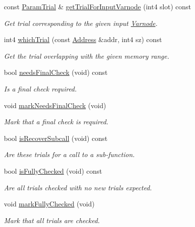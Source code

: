 \begin{DoxyCompactItemize}
const \mbox{\hyperlink{class_param_trial}{Param\+Trial}} \& \mbox{\hyperlink{class_param_active_a4ce9f8640c32eb48df409ff71a6e15eb}{get\+Trial\+For\+Input\+Varnode}} (int4 slot) const
\begin{DoxyCompactList}\small\item\em Get trial corresponding to the given input \mbox{\hyperlink{class_varnode}{Varnode}}. \end{DoxyCompactList}\item 
int4 \mbox{\hyperlink{class_param_active_a94904915a57b3a27a68053e85d6d08e1}{which\+Trial}} (const \mbox{\hyperlink{class_address}{Address}} \&addr, int4 sz) const
\begin{DoxyCompactList}\small\item\em Get the trial overlapping with the given memory range. \end{DoxyCompactList}\item 
bool \mbox{\hyperlink{class_param_active_a3b308bb5dafd2bafc5e425991deab476}{needs\+Final\+Check}} (void) const
\begin{DoxyCompactList}\small\item\em Is a final check required. \end{DoxyCompactList}\item 
void \mbox{\hyperlink{class_param_active_a7cf85723002b79c4500f3eba9159b7fa}{mark\+Needs\+Final\+Check}} (void)
\begin{DoxyCompactList}\small\item\em Mark that a final check is required. \end{DoxyCompactList}\item 
bool \mbox{\hyperlink{class_param_active_a3335a98aec79bc7b683f6edc0e954c96}{is\+Recover\+Subcall}} (void) const
\begin{DoxyCompactList}\small\item\em Are these trials for a call to a sub-\/function. \end{DoxyCompactList}\item 
bool \mbox{\hyperlink{class_param_active_a77a0cc16f6a28aeb1fae38416ed2c3ed}{is\+Fully\+Checked}} (void) const
\begin{DoxyCompactList}\small\item\em Are all trials checked with no new trials expected. \end{DoxyCompactList}\item 
void \mbox{\hyperlink{class_param_active_a139fd20617eb3a88e32bc960e03b9ad1}{mark\+Fully\+Checked}} (void)
\begin{DoxyCompactList}\small\item\em Mark that all trials are checked. \end{DoxyCompactList}\item 

\end{DoxyCompactItemize}
